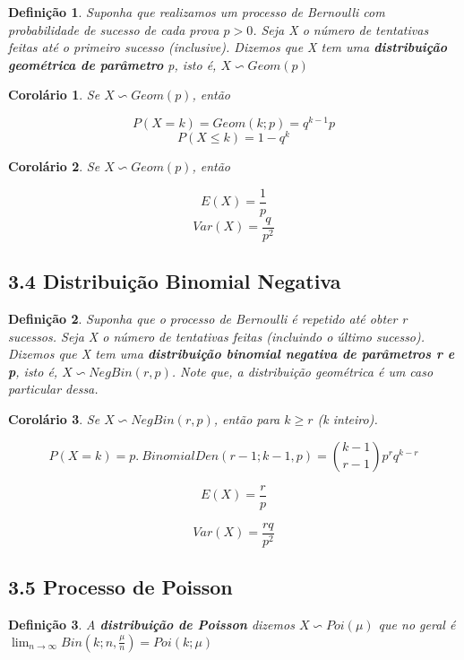 \documentclass[12pt]{article}
\newtheorem{corollary}{Corolário}[theorem]
\newtheorem{definition}{Definição}
\begin{document}
\begin{definition}
    Suponha que realizamos um processo de Bernoulli com probabilidade de sucesso de cada prova $p > 0$. Seja X o número de tentativas feitas até o primeiro sucesso (inclusive). Dizemos que X tem uma \textbf{distribuição geométrica de parâmetro} p, isto é, $X \backsim Geom (p)$
\end{definition}

\begin{corollary}
    Se $X \backsim Geom (p)$, então
    
    $$P(X = k) = Geom (k; p) = q^{k-1} p$$
    $$P(X \leq k) = 1 - q^k$$
\end{corollary}

\begin{corollary}
    Se $X \backsim Geom (p)$, então
    
    $$E(X) = \frac{1}{p}$$
    $$Var (X) = \frac{q}{p^2}$$
\end{corollary}

\subsection*{3.4 Distribuição Binomial Negativa}
\label{s14}

\begin{definition}
    Suponha que o processo de Bernoulli é repetido até obter r sucessos. Seja X o número de tentativas feitas (incluindo o último sucesso). Dizemos que X tem uma \textbf{distribuição binomial negativa de parâmetros r e p}, isto é, $X \backsim NegBin(r, p)$. Note que, a distribuição geométrica é um caso particular dessa.
\end{definition}

\begin{corollary}
    Se $X \backsim NegBin(r, p)$, então para $k \geq r$ (k inteiro).
    
    $$P(X = k) = p. \ BinomialDen(r-1; k-1, p) = {k-1 \choose r-1} p^r q^{k - r}$$
    
    $$E(X) = \dfrac{r}{p}$$
    
    $$Var(X) = \dfrac{r q}{p^2}$$
\end{corollary}

\subsection*{3.5 Processo de Poisson}
\label{s15}

\begin{definition}
    A \textbf{distribuição de Poisson} dizemos $X \backsim Poi (\mu)$ que no geral é $\lim_{n \rightarrow{} \infty} Bin (k; n, \frac{\mu}{n}) = Poi (k; \mu)$
\end{definition}
\end{document}
